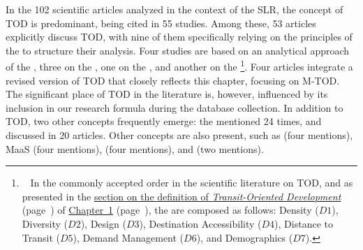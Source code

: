 \begin{refsegment}
In the 102 scientific articles analyzed in the context of the \acrshort{SLR}, the concept of \acrshort{TOD} is predominant, being cited in 55 studies. Among these, 53 articles explicitly discuss \acrshort{TOD}, with nine of them specifically relying on the principles of the  to structure their analysis. Four studies are based on an analytical approach of the , three on the , one on the , and another on the \footnote{~
    In the commonly accepted order in the scientific literature on \acrshort{TOD}, and as presented in the \hyperref[chap1:tod-presentation-generale-definition]{section on the definition of \textsl{Transit-Oriented Development}} (page~\pageref{chap1:tod-presentation-generale-definition}) of \hyperref[chap1:titre]{Chapter~1} (page~\pageref{chap1:titre}), the  are composed as follows: Density (\(D1\)), Diversity (\(D2\)), Design (\(D3\)), Destination Accessibility (\(D4\)), Distance to Transit (\(D5\)), Demand Management (\(D6\)), and Demographics (\(D7\)).
}. Four articles integrate a revised version of \acrshort{TOD} that closely reflects this chapter, focusing on \acrshort{M-TOD}. The significant place of \acrshort{TOD} in the literature is, however, influenced by its inclusion in our research formula during the database collection. In addition to \acrshort{TOD}, two other concepts frequently emerge: the  mentioned 24 times, and  discussed in 20 articles. Other concepts are also present, such as  (four mentions), \acrfull{MaaS} (four mentions),  (four mentions), and  (two mentions).%


\end{refsegment}

